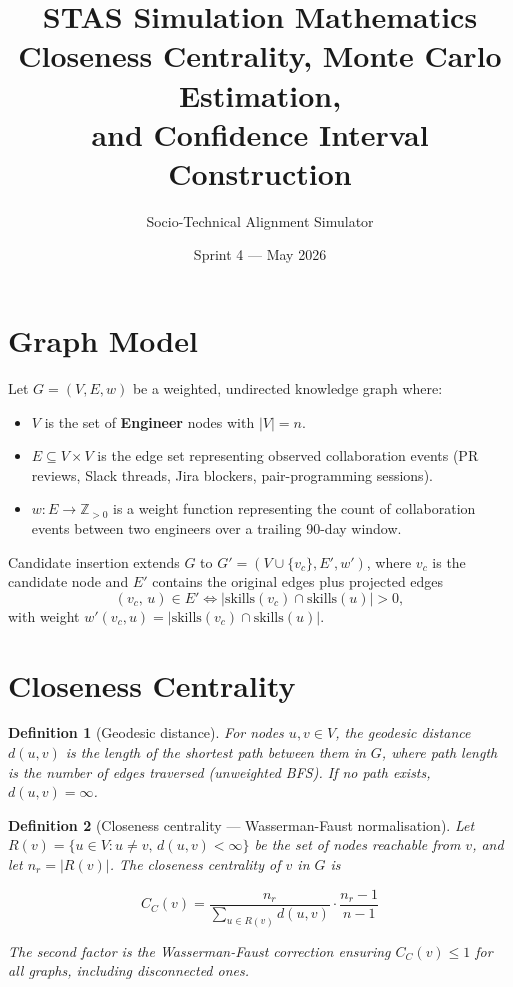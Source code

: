 \documentclass[12pt, a4paper]{article}
\title{%
  \textbf{STAS Simulation Mathematics}\\[0.5em]
  \large Closeness Centrality, Monte Carlo Estimation,\\
  and Confidence Interval Construction
}
\author{Socio-Technical Alignment Simulator}
\date{Sprint 4 --- May 2026}
\newtheorem{definition}{Definition}
\begin{document}
\maketitle
\tableofcontents
\newpage

\section{Graph Model}

Let $G = (V, E, w)$ be a weighted, undirected knowledge graph where:

\begin{itemize}
  \item $V$ is the set of \textbf{Engineer} nodes with $|V| = n$.
  \item $E \subseteq V \times V$ is the edge set representing observed
        collaboration events (PR reviews, Slack threads, Jira blockers,
        pair-programming sessions).
  \item $w : E \to \mathbb{Z}_{>0}$ is a weight function representing the
        count of collaboration events between two engineers over a trailing
        90-day window.
\end{itemize}

Candidate insertion extends $G$ to $G' = (V \cup \{v_c\}, E', w')$, where
$v_c$ is the candidate node and $E'$ contains the original edges plus
projected edges
\[
  (v_c,\, u) \in E' \iff |\text{skills}(v_c) \cap \text{skills}(u)| > 0,
\]
with weight $w'(v_c, u) = |\text{skills}(v_c) \cap \text{skills}(u)|$.

\section{Closeness Centrality}

\begin{definition}[Geodesic distance]
For nodes $u, v \in V$, the geodesic distance $d(u,v)$ is the length of the
shortest path between them in $G$, where path length is the number of edges
traversed (unweighted BFS).  If no path exists, $d(u,v) = \infty$.
\end{definition}

\begin{definition}[Closeness centrality --- Wasserman-Faust normalisation]
Let $R(v) = \{u \in V : u \neq v,\, d(u,v) < \infty\}$ be the set of nodes
reachable from $v$, and let $n_r = |R(v)|$.  The closeness centrality of $v$
in $G$ is

\begin{equation}
  \label{eq:cc}
  C_C(v) =
  \frac{n_r}{\displaystyle\sum_{u \in R(v)} d(u,v)}
  \cdot
  \frac{n_r - 1}{n - 1}
\end{equation}

The second factor is the Wasserman-Faust correction ensuring $C_C(v) \leq 1$
for all graphs, including disconnected ones.
\end{definition}
\end{document}
